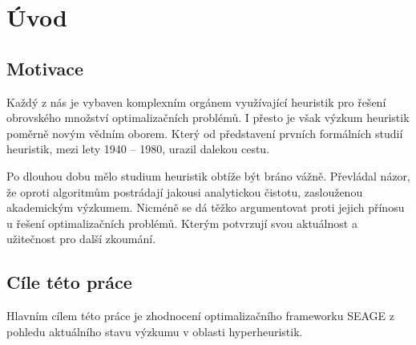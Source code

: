 \chapter{Úvod}
\setcounter{page}{1}

\section{Motivace}
Každý z nás je vybaven komplexním orgánem využívající heuristik pro řešení obrovského množství optimalizačních problémů. I přesto je však výzkum heuristik poměrně novým vědním oborem. Který od představení prvních formálních studií heuristik, mezi lety 1940 -- 1980, urazil dalekou cestu.\cite{sorensen2017-1} 

Po dlouhou dobu mělo studium heuristik obtíže být bráno vážně. Převládal názor, že oproti algoritmům postrádají jakousi analytickou čistotu, zaslouženou akademickým výzkumem. Nicméně se dá těžko argumentovat proti jejich přínosu u řešení optimalizačních problémů.\cite{sorensen2017-2} Kterým potvrzují svou aktuálnost a užitečnost pro další zkoumání.





\section{Cíle této práce}

Hlavním cílem této práce je zhodnocení optimalizačního frameworku SEAGE z pohledu aktuálního stavu výzkumu v oblasti hyperheuristik. 

